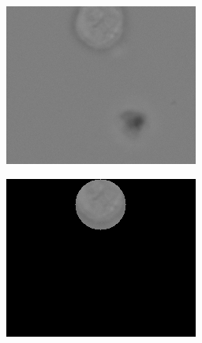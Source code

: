 \begin{figure}[h]
	\begin{center}
		\begin{subfigure}[b]{0.45\textwidth}
		    \centering
			\includegraphics[height= 0.10\textheight]{thesis-template-master/images/hd1 (4400).png}
			\caption{}
			\label{fig:res18}
		\end{subfigure}
		\begin{subfigure}[b]{0.45\textwidth}
		    \centering
			\includegraphics[height= 0.10\textheight]{thesis-template-master/images/hd1 (4400) (1).png}
			\caption{}
			\label{fig:cellnet}
		\end{subfigure}
		

\end{center}
\end{figure}
